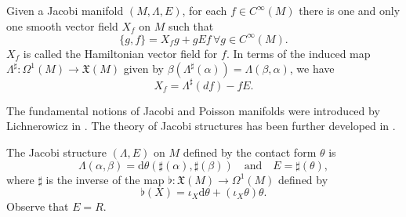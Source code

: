\documentclass[10pt]{amsart}
\numberwithin{equation}{section}
\newcommand{\rd}{\mathrm{d}}
\theoremstyle{definition}
\begin{document}
Given a Jacobi manifold $(M,\Lambda,E)$, for each $f\in C^{\infty}(M)$ there is one and only one smooth vector field $X_{f}$ on $M$ such that
\begin{equation}
\lbrace g,f\rbrace=X_{f}g+gEf \, \forall g\in C^{\infty}(M).
\end{equation}
$X_{f}$ is called the Hamiltonian vector field for $f$. In terms of the induced map $\Lambda^{\sharp}:\Omega^{1}(M)\longrightarrow \mathfrak{X}(M)$ given by $\beta(\Lambda^{\sharp}(\alpha))=\Lambda(\beta,\alpha)$, we have 
\begin{equation}
X_{f}=\Lambda^{\sharp}(df)-fE.
\end{equation}

The fundamental notions of Jacobi and Poisson manifolds were introduced by Lichnerowicz in \cite{Lich77,Lich78}. The theory of Jacobi structures has been further developed in \cite{Marle1991,ILM1997,LLMP1999,Esen2022,
Vais2002}.
\vspace{2mm}

The Jacobi structure $(\Lambda,E)$ on $M$ defined by the contact form $\theta$ is
\begin{equation}
\Lambda(\alpha,\beta)=\rd \theta(\sharp(\alpha),\sharp(\beta))\quad\text{and}\quad E=\sharp(\theta),
\end{equation}
where $\sharp$ is the inverse of the map $\flat:\mathfrak{X}(M)\longrightarrow\Omega^{1}(M)$ defined by 
\begin{equation}
\flat(X)=\iota_{X} \rd \theta +(\iota_{X} \theta) \theta.
\end{equation}
Observe that $E=R$.
\vspace{2mm}
\end{document}
